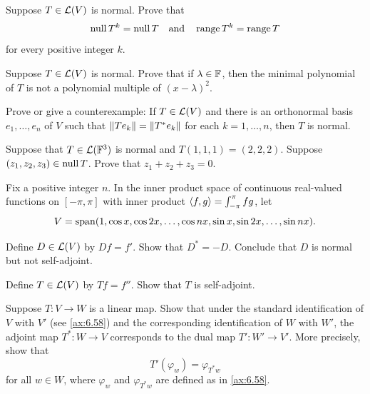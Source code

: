 \begin{exc}
\begin{exercise}
Suppose $T\in\mathcal{L}(V)$ is normal. Prove that
\[ \operatorname{null} T^k=\operatorname{null} T \quad\text{and}\quad \operatorname{range} T^k=\operatorname{range} T \]
for every positive integer $k$.
\end{exercise}

\begin{exercise}
Suppose $T\in\mathcal{L}(V)$ is normal. Prove that if $\lambda\in\mathbb{F}$, then the minimal
polynomial of $T$ is not a polynomial multiple of $(x-\lambda)^2$.
\end{exercise}

\begin{exercise}
Prove or give a counterexample: If $T\in\mathcal{L}(V)$ and there is an orthonormal
basis $e_1,\dots,e_n$ of $V$ such that $\lVert Te_k \rVert=\lVert T^*e_k \rVert$ for each
$k=1,\dots,n$, then $T$ is normal.
\end{exercise}

\begin{exercise}
Suppose that $T\in\mathcal{L}(\mathbb{F}^3)$ is normal and $T(1,1,1)=(2,2,2)$. Suppose
$(z_1,z_2,z_3)\in\operatorname{null} T$. Prove that $z_1+z_2+z_3=0$.
\end{exercise}

\begin{exercise}
Fix a positive integer $n$. In the inner product space of continuous
real-valued functions on $[-\pi,\pi]$ with inner product
$\langle f, g \rangle=\int_{-\pi}^{\pi}fg$, let
\[ V = \operatorname{span}(1,\cos x,\cos2x,\dots,\cos nx,\sin x,\sin2x,\dots,\sin nx). \]
\begin{parts}
\item Define $D\in\mathcal{L}(V)$ by $Df=f'$. Show that $D^*=-D$. Conclude that $D$ is
  normal but not self-adjoint.
\item Define $T\in\mathcal{L}(V)$ by $Tf=f''$. Show that $T$ is self-adjoint.
\end{parts}
\end{exercise}

\begin{exercise}
Suppose $T\colon V\to W$ is a linear map. Show that under the standard
identification of $V$ with $V'$ (see \ref{ax:6.58}) and the corresponding
identification of $W$ with $W'$, the adjoint map $T^*\colon W\to V$ corresponds
to the dual map $T'\colon W'\to V'$. More precisely, show that
\[ T'(\varphi_w) = \varphi_{T^*w} \]
for all $w\in W$, where $\varphi_w$ and $\varphi_{T^*w}$ are defined as in
\ref{ax:6.58}.
\end{exercise}
\end{exc}

